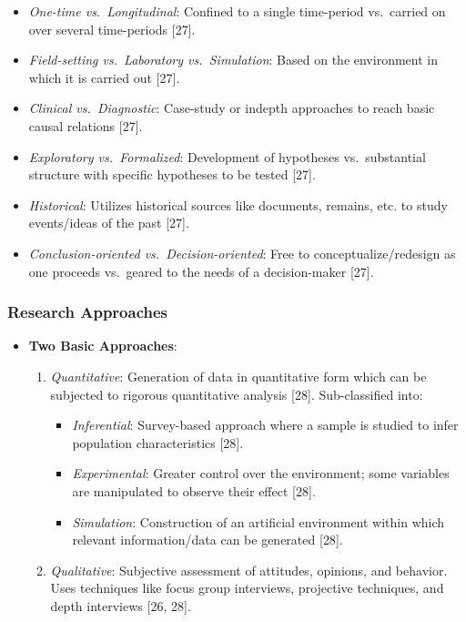 \documentclass[
]{article}
\providecommand{\tightlist}{%
  \setlength{\itemsep}{0pt}\setlength{\parskip}{0pt}}
\begin{document}
\begin{itemize}
  \begin{itemize}
  \tightlist
  \item
    \emph{One-time vs.~Longitudinal}: Confined to a single time-period
    vs.~carried on over several time-periods {[}27{]}.
  \item
    \emph{Field-setting vs.~Laboratory vs.~Simulation}: Based on the
    environment in which it is carried out {[}27{]}.
  \item
    \emph{Clinical vs.~Diagnostic}: Case-study or indepth approaches to
    reach basic causal relations {[}27{]}.
  \item
    \emph{Exploratory vs.~Formalized}: Development of hypotheses
    vs.~substantial structure with specific hypotheses to be tested
    {[}27{]}.
  \item
    \emph{Historical}: Utilizes historical sources like documents,
    remains, etc. to study events/ideas of the past {[}27{]}.
  \item
    \emph{Conclusion-oriented vs.~Decision-oriented}: Free to
    conceptualize/redesign as one proceeds vs.~geared to the needs of a
    decision-maker {[}27{]}.
  \end{itemize}
\end{itemize}

\subsubsection{Research Approaches}\label{research-approaches}

\begin{itemize}
\tightlist
\item
  \textbf{Two Basic Approaches}:

  \begin{enumerate}
  \def\labelenumi{\arabic{enumi}.}
  \tightlist
  \item
    \emph{Quantitative}: Generation of data in quantitative form which
    can be subjected to rigorous quantitative analysis {[}28{]}.
    Sub-classified into:

    \begin{itemize}
    \tightlist
    \item
      \emph{Inferential}: Survey-based approach where a sample is
      studied to infer population characteristics {[}28{]}.
    \item
      \emph{Experimental}: Greater control over the environment; some
      variables are manipulated to observe their effect {[}28{]}.
    \item
      \emph{Simulation}: Construction of an artificial environment
      within which relevant information/data can be generated {[}28{]}.
    \end{itemize}
  \item
    \emph{Qualitative}: Subjective assessment of attitudes, opinions,
    and behavior. Uses techniques like focus group interviews,
    projective techniques, and depth interviews {[}26, 28{]}.
  \end{enumerate}
\end{itemize}
\end{document}
